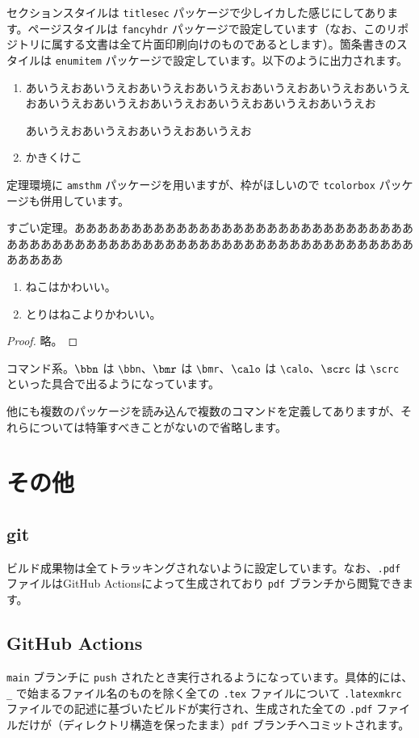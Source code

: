 \documentclass[a4paper]{ltjsarticle}
\begin{document}
セクションスタイルは \texttt{titlesec} パッケージで少しイカした感じにしてあります。ページスタイルは \texttt{fancyhdr} パッケージで設定しています（なお、このリポジトリに属する文書は全て片面印刷向けのものであるとします）。箇条書きのスタイルは \texttt{enumitem} パッケージで設定しています。以下のように出力されます。
\begin{enumerate}
  \item あいうえおあいうえおあいうえおあいうえおあいうえおあいうえおあいうえおあいうえおあいうえおあいうえおあいうえおあいうえおあいうえお

  あいうえおあいうえおあいうえおあいうえお
  \item かきくけこ
\end{enumerate}

定理環境に \texttt{amsthm} パッケージを用いますが、枠がほしいので \texttt{tcolorbox} パッケージも併用しています。

\begin{thm}[ねこちゃんの定理]
  すごい定理。あああああああああああああああああああああああああああああああああああああああああああああああああああああああああああああああああああああああ
  \begin{enumerate}
    \item ねこはかわいい。
    \item とりはねこよりかわいい。
  \end{enumerate}
\end{thm}
\begin{proof}
  略。
\end{proof}

コマンド系。$\bbn$ は \texttt{\textbackslash bbn}、$\bmr$ は \texttt{\textbackslash bmr}、$\calo$ は \texttt{\textbackslash calo}、$\scrc$ は \texttt{\textbackslash scrc} といった具合で出るようになっています。

他にも複数のパッケージを読み込んで複数のコマンドを定義してありますが、それらについては特筆すべきことがないので省略します。

\section{その他}

\subsection{git}
ビルド成果物は全てトラッキングされないように設定しています。なお、\texttt{.pdf} ファイルはGitHub Actionsによって生成されており \texttt{pdf} ブランチから閲覧できます。

\subsection{GitHub Actions}
\texttt{main} ブランチに \texttt{push} されたとき実行されるようになっています。具体的には、\texttt{\_} で始まるファイル名のものを除く全ての \texttt{.tex} ファイルについて \texttt{.latexmkrc} ファイルでの記述に基づいたビルドが実行され、生成された全ての \texttt{.pdf} ファイルだけが（ディレクトリ構造を保ったまま）\texttt{pdf} ブランチへコミットされます。
\end{document}

